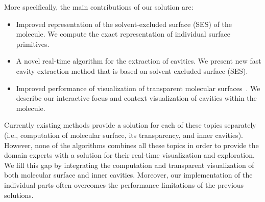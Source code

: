 More specifically, the main contributions of our solution are:
\begin{itemize}
  \item  Improved representation of the solvent-excluded surface (SES) of the molecule. We compute the exact representation of individual surface primitives.
  \item A novel real-time algorithm for the extraction of cavities. We present new fast cavity extraction method that is based on solvent-excluded surface (SES).
  \item Improved performance of visualization of transparent molecular surfaces~\cite{kauker2013rendering}. We describe our interactive focus and context visualization of cavities within the molecule.
  
\end{itemize}

Currently existing methods provide a solution for each of these topics separately (i.e., computation of molecular surface, its transparency, and inner cavities).
However, none of the algorithms combines all these topics in order to provide the domain experts with a solution for their real-time visualization and exploration.
We fill this gap by integrating the computation and transparent visualization of both molecular surface and inner cavities.
Moreover, our implementation of the individual parts often overcomes the performance limitations of the previous solutions.



